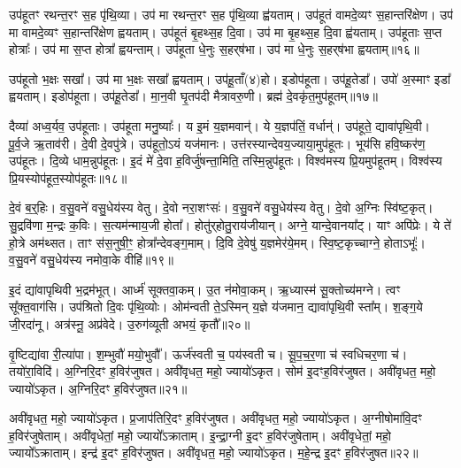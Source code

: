 उप॑हूतꣳ रथन्त॒रꣳ स॒ह पृ॑थि॒व्या।
उप॑ मा रथन्त॒रꣳ स॒ह पृ॑थि॒व्या ह्व॑यताम्।
उप॑हूतं वामदे॒व्यꣳ स॒हान्तरि॑क्षेण।
उप॑ मा वामदे॒व्यꣳ स॒हान्तरि॑क्षेण ह्वयताम्।
उप॑हूतं बृ॒हथ्स॒ह दि॒वा।
उप॑ मा बृ॒हथ्स॒ह दि॒वा ह्व॑यताम्।
उप॑हूताः स॒प्त होत्राः᳚।
उप॑ मा स॒प्त होत्रा᳚ ह्वयन्ताम्।
उप॑हूता धे॒नुः स॒हर्‌\mbox{}ष॑भा।
उप॑ मा धे॒नुः स॒हर्‌\mbox{}ष॑भा ह्वयताम्॥१६॥

उप॑हूतो भ॒क्षः सखा᳚।
उप॑ मा भ॒क्षः सखा᳚ ह्वयताम्।
उप॑हू॒ताँ(४)हो।
इडोप॑हूता।
उप॑हू॒तेडा᳚।
उपो॑ अ॒स्माꣳ इडा᳚ ह्वयताम्।
इडोप॑हूता।
उप॑हू॒तेडा᳚।
मा॒न॒वी घृ॒तप॑दी मैत्रावरु॒णी।
ब्रह्म॑ दे॒वकृ॑त॒मुप॑हूतम्॥१७॥

दैव्या॑ अध्व॒र्यव॒ उप॑हूताः।
उप॑हूता मनु॒ष्याः᳚।
य इ॒मं य॒ज्ञमवान्॑।
ये य॒ज्ञप॑तिं॒ वर्धान्॑।
उप॑हूते॒ द्यावा॑पृथि॒वी।
पू॒र्व॒जे ऋ॒ताव॑री।
दे॒वी दे॒वपु॑त्रे।
उप॑हूतो॒ऽयं यज॑मानः।
उत्त॑रस्यान्देवय॒ज्याया॒मुप॑हूतः।
भूय॑सि हवि॒ष्कर॑ण॒ उप॑हूतः।
दि॒व्ये धाम॒न्नुप॑हूतः।
इ॒दं मे॑ दे॒वा ह॒विर्जु॑षन्ता॒मिति॒ तस्मि॒न्नुप॑हूतः।
विश्व॑मस्य प्रि॒यमुप॑हूतम्।
विश्व॑स्य प्रि॒यस्योप॑हूत॒स्योप॑हूतः॥१८॥

दे॒वं ब॒र्‌॒\mbox{}हिः।
व॒सु॒वने॑ वसु॒धेय॑स्य वेतु।
दे॒वो नरा॒शꣳसः॑।
व॒सु॒वने॑ वसु॒धेय॑स्य वेतु।
दे॒वो अ॒ग्निः स्वि॑ष्ट॒कृत्।
सु॒द्रवि॑णा म॒न्द्रः क॒विः।
स॒त्यम॑न्माय॒जी होता᳚।
होतु॑र्‌\mbox{}होतु॒राय॑जीयान्।
अग्ने॒ यान्दे॒वानया᳚ट्।
याꣳ अपि॑प्रेः।
ये ते॑ हो॒त्रे अम॑थ्सत।
ताꣳ स॑स॒नुषी॒ꣳ॒ होत्रा᳚न्देवङ्ग॒माम्।
दि॒वि दे॒वेषु॑ य॒ज्ञमेर॑ये॒मम्।
स्वि॒ष्ट॒कृच्चाग्ने॒ होता\-ऽभूः᳚।
व॒सु॒वने॑ वसु॒धेय॑स्य नमोवा॒के वीहि॑॥१९॥\anuvakamend[अपि॑प्रेः॒ पञ्च॑ च]

इ॒दं द्या॑वापृथिवी भ॒द्रम॑भूत्।
आर्ध्म॑ सूक्तवा॒कम्।
उ॒त न॑मोवा॒कम्।
ऋ॒ध्यास्म॑ सू॒क्तोच्य॑मग्ने।
त्वꣳ सू᳚क्त॒वाग॑सि।
उप॑श्रितो दि॒वः पृ॑थि॒व्योः।
ओम॑न्वती ते॒\-ऽस्मिन् य॒ज्ञे य॑जमान॒ द्यावा॑पृथि॒वी स्ता᳚म्।
श॒ङ्ग॒ये जी॒रदा॑नू।
अत्र॑स्नू॒ अप्र॑वेदे।
उ॒रुग॑व्यूती अभयं॒ कृतौ᳚॥२०॥

वृ॒ष्टिद्या॑वा री॒त्या॑पा।
श॒म्भुवौ॑ मयो॒भुवौ᳚।
ऊर्ज॑स्वती च॒ पय॑स्वती च।
सू॒प॒च॒र॒णा च॑ स्वधिचर॒णा च॑।
तयो॑रा॒विदि॑।
अ॒ग्निरि॒दꣳ ह॒विर॑जुषत।
अवी॑वृधत॒ महो॒ ज्यायो॑ऽकृत।
सोम॑ इ॒दꣳह॒विर॑जुषत।
अवी॑वृधत॒ महो॒ ज्यायो॑ऽकृत।
अ॒ग्निरि॒दꣳ ह॒विर॑जुषत॥२१॥

अवी॑वृधत॒ महो॒ ज्यायो॑ऽकृत।
प्र॒जा\-प॑तिरि॒दꣳ ह॒विर॑जुषत।
अवी॑वृधत॒ महो॒ ज्यायो॑ऽकृत।
अ॒ग्नीषोमा॑वि॒दꣳ ह॒विर॑जुषेताम्।
अवी॑वृधेतां॒ महो॒ ज्यायो᳚\-ऽक्राताम्।
इ॒न्द्रा॒ग्नी इ॒दꣳ ह॒विर॑जुषेताम्।
अवी॑वृधेतां॒ महो॒ ज्यायो᳚\-ऽक्राताम्।
इन्द्र॑ इ॒दꣳ ह॒विर॑जुषत।
अवी॑वृधत॒ महो॒ ज्यायो॑ऽकृत।
म॒हे॒न्द्र इ॒दꣳ ह॒विर॑जुषत॥२२॥

